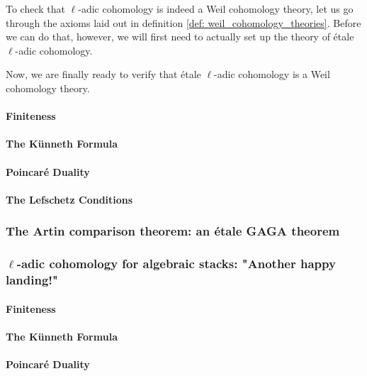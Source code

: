             To check that $\ell$-adic cohomology is indeed a Weil cohomology theory, let us  go through the axioms laid out in definition \ref{def: weil_cohomology_theories}. Before we can do that, however, we will first need to actually set up the theory of \'etale $\ell$-adic cohomology.
            
            Now, we are finally ready to verify that \'etale $\ell$-adic cohomology is a Weil cohomology theory.
            \paragraph{Finiteness}
        
            \paragraph{The K\"unneth Formula}
            
            \paragraph{Poincar\'e Duality}
        
            \paragraph{The Lefschetz Conditions}
    
        \subsubsection{The Artin comparison theorem: an \'etale GAGA theorem}
        
        \subsubsection{\texorpdfstring{$\ell$}{}-adic cohomology for algebraic stacks: "Another happy landing!"}
            \paragraph{Finiteness}
        
            \paragraph{The K\"unneth Formula}
            
            \paragraph{Poincar\'e Duality}
        
